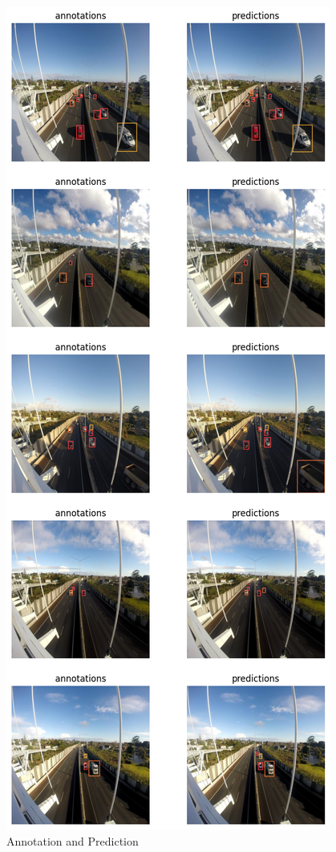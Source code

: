 \begin{figure}[H]
    \centering
    \includegraphics[width=0.6\linewidth]{tex/img/L-annotations_predictions.png}
    \caption{Annotation and Prediction}
    \label{fig:L-annot-pred}
\end{figure}

